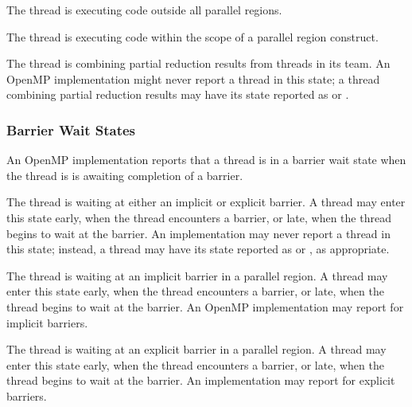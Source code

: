 \begin{description}

\item {} 

  The thread is executing code outside all parallel regions. 

\item {} 

  The thread is executing code within the scope of a parallel region construct.

\sloppy
\item {} 
 
  The thread is combining partial reduction results from threads in its team. 
  An OpenMP implementation  
  might never report a thread in this state; a thread
  combining partial reduction results may have its state reported as
   or .

\end{description}


\subsubsection{Barrier Wait States}

An OpenMP implementation reports that a thread is in a barrier wait state 
when the thread is is awaiting completion of a barrier.


\begin{description}

  \item {} 
  
  \sloppy
  The thread is waiting at either an implicit or explicit barrier.
  A thread may enter this state
  early, when the thread encounters a barrier, or late, when the
  thread begins to wait at the barrier. An implementation may never report a thread in this state; instead, a thread may have its state reported
  as   or , as appropriate.
  
  \item {} 
  
  \sloppy
  The thread is waiting at an implicit barrier in a parallel region. 
  A  thread may enter this state
  early, when the thread encounters a barrier, or late, when the
  thread begins to wait at the barrier.
  An OpenMP implementation may report  
  for implicit barriers.
  
  \item {} 

  The thread is waiting at an explicit barrier  in a parallel region. 
  A thread may enter this state
  early, when the thread encounters a barrier, or late, when the
  thread begins to wait at the barrier.
  An implementation may report  
  for explicit barriers.
  
\end{description}
  
